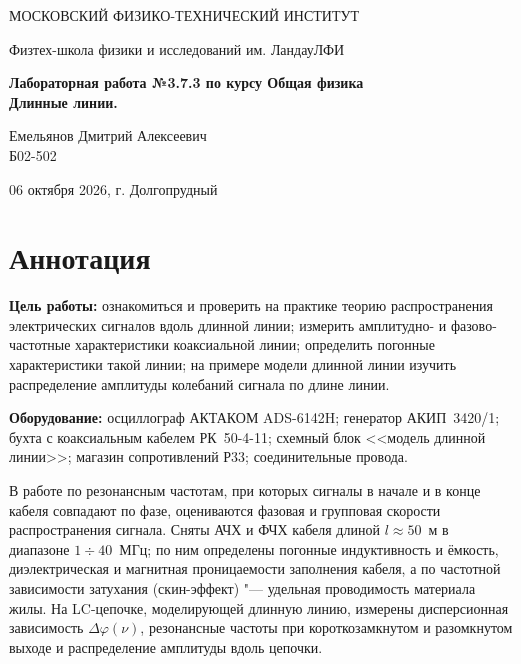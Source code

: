 \documentclass[a4paper,12pt]{article}
\begin{document}
\begin{titlepage}
\begin{center}
    {\large МОСКОВСКИЙ ФИЗИКО-ТЕХНИЧЕСКИЙ ИНСТИТУТ}
\end{center}
\begin{center}
    {\large Физтех-школа физики и исследований им. Ландау\break ЛФИ}
\end{center}

    \vspace{3cm}

\vspace{0.15cm}
{
\begin{center}
    \huge \bf Лабораторная работа №3.7.3 по курсу Общая физика\\
    \vspace{0.4cm}
    \LARGE Длинные линии.
\end{center}
}
\vspace{1.5cm}
\begin{flushright}
Емельянов Дмитрий Алексеевич\\
\vspace{0.4cm}
Б02-502
\end{flushright}
\vspace{10cm}
\begin{center}
    \large 06 октября 2026, г. Долгопрудный
\end{center}
\end{titlepage}

\section{Аннотация}

\textbf{Цель работы:} ознакомиться и проверить на практике теорию
распространения электрических сигналов вдоль длинной линии; измерить
амплитудно- и фазово-частотные характеристики коаксиальной линии; определить
погонные характеристики такой линии; на примере модели длинной линии изучить
распределение амплитуды колебаний сигнала по длине линии.

\textbf{Оборудование:} осциллограф АКТАКОМ ADS-6142H; генератор АКИП~3420/1;
бухта с коаксиальным кабелем РК~50-4-11; схемный блок <<модель длинной
линии>>; магазин сопротивлений Р33; соединительные провода.

В работе по резонансным частотам, при которых сигналы в начале и в конце
кабеля совпадают по фазе, оцениваются фазовая и групповая скорости
распространения сигнала. Сняты АЧХ и ФЧХ кабеля длиной $l\approx50$~м в
диапазоне $1\div40$~МГц; по ним определены погонные индуктивность и ёмкость,
диэлектрическая и магнитная проницаемости заполнения кабеля, а по
частотной зависимости затухания (скин-эффект) "--- удельная проводимость
материала жилы. На LC-цепочке, моделирующей длинную линию, измерены
дисперсионная зависимость $\Delta\varphi(\nu)$, резонансные частоты при
короткозамкнутом и разомкнутом выходе и распределение амплитуды вдоль
цепочки.
\end{document}
